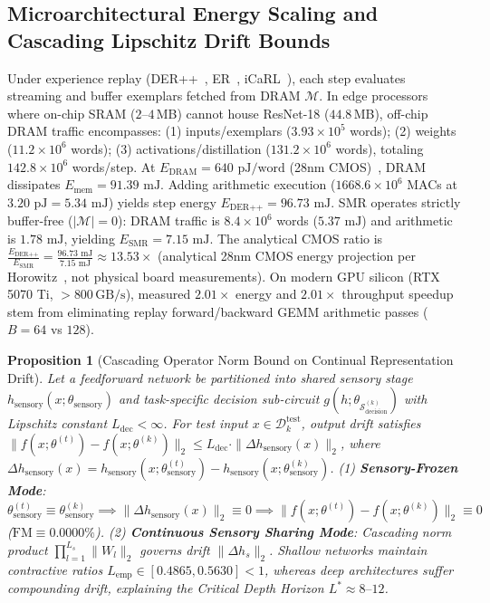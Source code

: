 \documentclass{article}
\newtheorem{proposition}[theorem]{Proposition}
\begin{document}
\subsection{Microarchitectural Energy Scaling and Cascading Lipschitz Drift Bounds}
\label{sec:proof_energy_scaling}
\label{sec:lipschitz_bound_analysis}
Under experience replay (DER++~\cite{buzzega2020dark}, ER~\cite{chaudhry2019tiny}, iCaRL~\cite{rebuffi2017icarl}), each step evaluates streaming and buffer exemplars fetched from DRAM $\mathcal{M}$. In edge processors where on-chip SRAM ($2\text{--}4$\,MB) cannot house ResNet-18 ($44.8$\,MB), off-chip DRAM traffic encompasses: (1) inputs/exemplars ($3.93 \times 10^5$ words); (2) weights ($11.2 \times 10^6$ words); (3) activations/distillation ($131.2 \times 10^6$ words), totaling $142.8 \times 10^6$ words/step. At $E_{\text{DRAM}} = 640\text{ pJ/word}$ (28nm CMOS)~\cite{horowitz2014computing, sze2017efficient}, DRAM dissipates $E_{\text{mem}} = 91.39\text{ mJ}$. Adding arithmetic execution ($1668.6 \times 10^6$ MACs at $3.20\text{ pJ} = 5.34\text{ mJ}$) yields step energy $E_{\text{DER++}} = 96.73\text{ mJ}$. SMR operates strictly buffer-free ($|\mathcal{M}| = 0$): DRAM traffic is $8.4 \times 10^6$ words ($5.37\text{ mJ}$) and arithmetic is $1.78\text{ mJ}$, yielding $E_{\text{SMR}} = 7.15\text{ mJ}$. The analytical CMOS ratio is $\frac{E_{\text{DER++}}}{E_{\text{SMR}}} = \frac{96.73\text{ mJ}}{7.15\text{ mJ}} \approx 13.53\times$ (analytical 28nm CMOS energy projection per Horowitz~\cite{horowitz2014computing}, not physical board measurements). On modern GPU silicon (RTX 5070 Ti, $>800\,\text{GB/s}$), measured $2.01\times$ energy and $2.01\times$ throughput speedup stem from eliminating replay forward/backward GEMM arithmetic passes ($B=64$ vs $128$).

\begin{proposition}[Cascading Operator Norm Bound on Continual Representation Drift]
\label{lem:lipschitz_bound}
Let a feedforward network be partitioned into shared sensory stage $h_{\mathrm{sensory}}(x; \theta_{\mathrm{sensory}})$ and task-specific decision sub-circuit $g(h; \theta_{\mathcal{S}_{\mathrm{decision}}^{(k)}})$ with Lipschitz constant $L_{\mathrm{dec}} < \infty$. For test input $x \in \mathcal{D}_k^{\mathrm{test}}$, output drift satisfies $\| f(x; \theta^{(t)}) - f(x; \theta^{(k)}) \|_2 \le L_{\mathrm{dec}} \cdot \| \Delta h_{\mathrm{sensory}}(x) \|_2$, where $\Delta h_{\mathrm{sensory}}(x) = h_{\mathrm{sensory}}(x; \theta_{\mathrm{sensory}}^{(t)}) - h_{\mathrm{sensory}}(x; \theta_{\mathrm{sensory}}^{(k)})$. (1) \textbf{Sensory-Frozen Mode}: $\theta_{\mathrm{sensory}}^{(t)} \equiv \theta_{\mathrm{sensory}}^{(k)} \implies \|\Delta h_{\mathrm{sensory}}(x)\|_2 \equiv 0 \implies \| f(x; \theta^{(t)}) - f(x; \theta^{(k)}) \|_2 \equiv 0$ ($\mathrm{FM} \equiv 0.0000\%$). (2) \textbf{Continuous Sensory Sharing Mode}: Cascading norm product $\prod_{l=1}^{L_s} \|W_l\|_2$ governs drift $\|\Delta h_s\|_2$. Shallow networks maintain contractive ratios $L_{\mathrm{emp}} \in [0.4865, 0.5630] < 1$, whereas deep architectures suffer compounding drift, explaining the Critical Depth Horizon $L^* \approx 8\text{--}12$.
\end{proposition}
\end{document}
